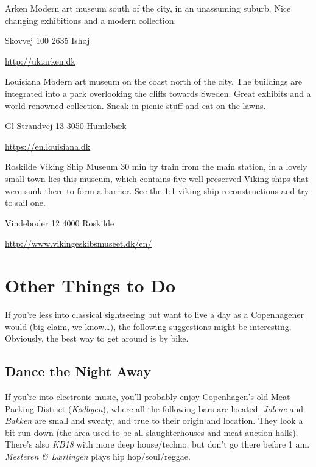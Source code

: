 \begin{left}
\begin{eventitem}
\begin{eventitem}
\begin{eventitem}
\begin{funitem}
{Arken}
{Modern art museum south of the city, in an unassuming suburb. Nice changing exhibitions and a modern collection. }
{\begin{addr}
{Skovvej 100}
{2635 Ishøj}
\end{addr}}
{\url{http://uk.arken.dk}}
{\begin{ohours}
{}
{}
{}
{}
{}
{}
{}
{}
\end{ohours}}
\end{funitem}
\begin{funitem}
{Louisiana}
{Modern art museum on the coast north of the city. The buildings are integrated into a park overlooking the cliffs towards Sweden. Great exhibits and a world-renowned collection. Sneak in picnic stuff and eat on the lawns.}
{\begin{addr}
{Gl Strandvej 13}
{3050 Humlebæk}
\end{addr}}
{\url{https://en.louisiana.dk}}
{\begin{ohours}
{}
{}
{}
{}
{}
{}
{}
{}
\end{ohours}}
\end{funitem}
\begin{funitem}
{Roskilde Viking Ship Museum}
{30 min by train from the main station, in a lovely small town lies this museum, which contains five well-preserved Viking ships that were sunk there to form a barrier. See the 1:1 viking ship reconstructions and try to sail one.}
{\begin{addr}
{Vindeboder 12}
{4000 Roskilde}
\end{addr}}
{\url{http://www.vikingeskibsmuseet.dk/en/}}
{\begin{ohours}
{}
{}
{}
{}
{}
{}
{}
{}
\end{ohours}}
\end{funitem}



\section{Other Things to Do}
If you’re less into classical sightseeing but want to live a day as a Copenhagener would (big claim, we know\dots), the following suggestions might be interesting. Obviously, the best way to get around is by bike.

\subsection{Dance the Night Away}
If you’re into electronic music, you’ll probably enjoy Copenhagen’s old Meat Packing District (\textit{Kødbyen}), where all the following bars are located. \textit{Jolene} and \textit{Bakken} are small and sweaty, and true to their origin and location. They look a bit run-down (the area used to be all slaughterhouses and meat auction halls). There’s also \textit{KB18} with more deep house/techno, but don’t go there before 1 am. \textit{Mesteren \& Lærlingen} plays hip hop/soul/reggae.


\end{eventitem}
\end{eventitem}
\end{eventitem}
\end{left}
